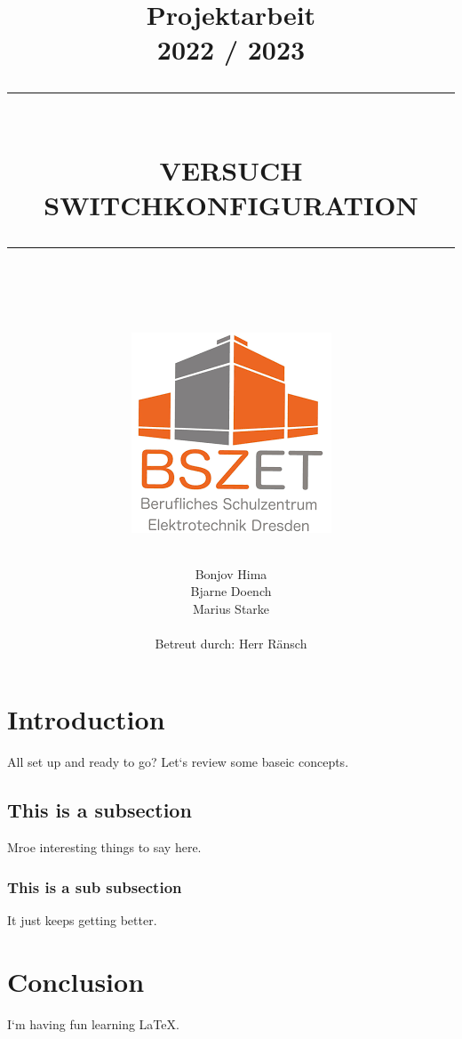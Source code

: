 \documentclass[a4paper, 12pt]{article}
\title{ \normalsize \textbf{Projektarbeit}
    \\2022 / 2023
    \leavevmode\\ [2.0cm]
    \hrule
    \leavevmode\\ [0.5cm]
    \LARGE \textbf{\uppercase{Versuch Switchkonfiguration}}
    \leavevmode\\ [1cm] 
    \hrule
    \leavevmode\\ [2cm] 
    \begin{center}
    \includegraphics[scale=0.6]{bszet-lgo.png}
    \end{center}
	\normalsize  \vspace*{4.7\baselineskip}}
\date{}
\author{
    Bonjov Hima \\
    Bjarne Doench \\
    Marius Starke \\ \\
    Betreut durch: Herr Ränsch}
\begin{document}
\maketitle
\thispagestyle{empty}

\newpage
\setcounter{page}{1}

\tableofcontents
\newpage

\section{Introduction}

All set up and ready to go? Let`s review some baseic concepts.

\subsection{This is a subsection}

Mroe interesting things to say here.

\subsubsection{This is a sub subsection}

It just keeps getting better.

\section{Conclusion}

I`m having fun learning \LaTeX.
\end{document}
